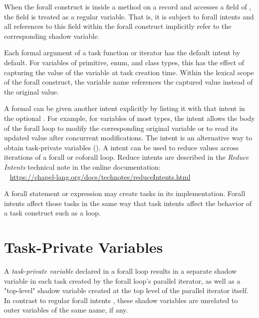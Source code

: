 When the forall construct is inside a method on a record and accesses
a field of , the field is treated as a regular variable.
That is, it is subject to forall intents and all references to this field
within the forall construct implicitly refer to the corresponding
shadow variable.

Each formal argument of a task function or iterator has the default
intent by default.  For variables of primitive, enum, and class
types, this has the effect of capturing the value of the
variable at task creation time.  Within the lexical scope of the
forall construct, the variable name references the
captured value instead of the original value.

A formal can be given another intent explicitly by listing it
with that intent in the optional .
For example, for variables of most types, the  intent allows
the body of the forall loop to modify the corresponding original
variable or to read its updated value after concurrent modifications.
The  intent is an alternative way to obtain task-private
variables ().
A  intent can be used to reduce values across iterations
of a forall or coforall loop.
Reduce intents are described in the \emph{Reduce Intents} technical note
in the online documentation:
\\ %
\mbox{$$ $$ $$} %
\url{https://chapel-lang.org/docs/technotes/reduceIntents.html}

\begin{rationale}
A forall statement or expression may create tasks in its implementation.
Forall intents affect those tasks in the same way that task intents
affect the behavior of a task construct such as a  loop.
\end{rationale}


\section{Task-Private Variables}
\label{Task_Private_Variables}

A \emph{task-private variable} declared in a forall loop results
in a separate shadow variable in each task created by the forall
loop's parallel iterator, as well as a "top-level" shadow variable
created at the top level of the parallel iterator itself.
In contrast to regular forall intents ,
these shadow variables are unrelated to outer variables
of the same name, if any.

